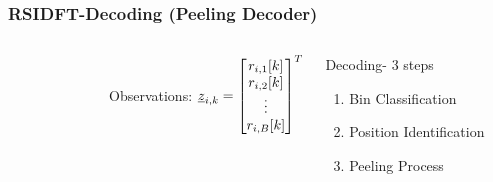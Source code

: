 \begin{frame}\frametitle{RSIDFT-Decoding (Peeling Decoder)}
\begin{columns}
		\begin{figure}[h!]
			\begin{center}
				\resizebox{1.0\textwidth}{!}{}	
			\end{center}	   
		\end{figure}
	    \begin{block}{Observations:}
	          $
	    		\underline{z}_{i,k} = \begin{bmatrix}
	    		r_{i,1}[k]\\
	    		r_{i,2}[k]\\
	    		\vdots\\
	    		r_{i,B}[k]
	    		\end{bmatrix}^{T}  
	    		$
	    	\end{block}
	    	\begin{block}{Decoding- 3 steps}	 
	    		\begin{enumerate}
	    			\item Bin Classification
	    			\item Position Identification
	    			\item Peeling Process
	    		\end{enumerate}
	  
	    \end{block}
	    
		
\end{columns}
	
		
						
\end{frame}

